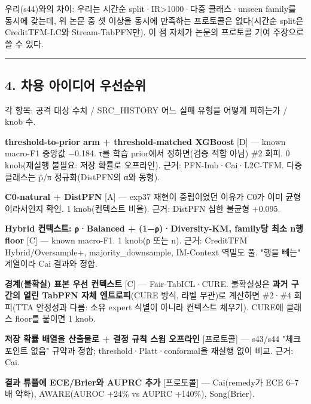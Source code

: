 \endgroup
우리(s44)와의 차이: 우리는 시간순 split·IR>1000·다중 클래스·unseen family를 동시에 갖는데, 위 논문 중 셋 이상을 동시에 만족하는 프로토콜은 없다(시간순 split은 CreditTFM-LC와 Stream-TabPFN만). 이 점 자체가 논문의 프로토콜 기여 주장으로 쓸 수 있다.


\medskip\hrule\medskip
\subsection{4. 차용 아이디어 우선순위}
각 항목: 공격 대상 수치 /\allowbreak{} SRC\_\allowbreak{}HISTORY 어느 실패 유형을 어떻게 피하는가 /\allowbreak{} knob 수.

\par\noindent \textbullet\enspace \textbf{threshold-to-prior arm +\allowbreak{} threshold-matched XGBoost} [D] — known macro-F1 중앙값 −0.184. τ를 학습 prior에서 정하면(검증 적합 아님) \#2 회피. 0 knob(재실행 불필요: 저장 확률로 오프라인). 근거: PFN-Imb·Cai·L2C-TFM. 다중 클래스는 p̂/\allowbreak{}π 정규화(DistPFN의 α와 동형).


\par\noindent \textbullet\enspace \textbf{C0-natural +\allowbreak{} DistPFN} [A] — exp37 재현이 중립이었던 이유가 C0가 이미 균형이라서인지 확인. 1 knob(컨텍스트 비율). 근거: DistPFN 심한 불균형 +\allowbreak{}0.095.


\par\noindent \textbullet\enspace \textbf{Hybrid 컨텍스트: ρ·Balanced +\allowbreak{} (1−ρ)·Diversity-KM, family당 최소 n행 floor} [C] — known macro-F1. 1 knob(ρ 또는 n). 근거: CreditTFM Hybrid/\allowbreak{}Oversample+\allowbreak{}, majority\_\allowbreak{}downsample, IM-Context 역밀도 풀. "행을 빼는" 계열이라 Cai 결과와 정합.


\par\noindent \textbullet\enspace \textbf{경계(불확실) 표본 우선 컨텍스트} [C] — Fair-TabICL·CURE. 불확실성은 \textbf{과거 구간의 얼린 TabPFN 자체 엔트로피}(CURE 방식, 라벨 무관)로 계산하면 \#2·\#4 회피(TTA 안정성과 다름: 소유 expert 식별이 아니라 컨텍스트 채우기). CURE에 클래스 floor를 붙이면 1 knob.


\par\noindent \textbullet\enspace \textbf{저장 확률 배열을 산출물로 +\allowbreak{} 결정 규칙 스윕 오프라인} [프로토콜] — s43/\allowbreak{}s44 "체크포인트 없음" 규약과 정합; threshold·Platt·conformal을 재실행 없이 비교. 근거: Cai.


\par\noindent \textbullet\enspace \textbf{결과 튜플에 ECE/\allowbreak{}Brier와 AUPRC 추가} [프로토콜] — Cai(remedy가 ECE 6–7배 악화), AWARE(AUROC +\allowbreak{}24\% vs AUPRC +\allowbreak{}140\%), Song(Brier).


